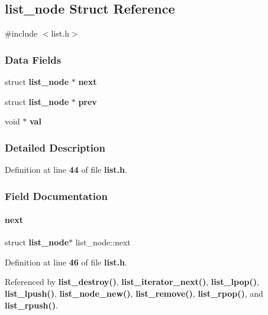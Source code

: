 \subsection{list\+\_\+node Struct Reference}
\label{a00167}


{\ttfamily \#include $<$list.\+h$>$}

\subsubsection*{Data Fields}
\begin{DoxyCompactItemize}
\item 
struct \textbf{ list\+\_\+node} $\ast$ \textbf{ next}
\item 
struct \textbf{ list\+\_\+node} $\ast$ \textbf{ prev}
\item 
void $\ast$ \textbf{ val}
\end{DoxyCompactItemize}


\subsubsection{Detailed Description}


Definition at line \textbf{ 44} of file \textbf{ list.\+h}.



\subsubsection{Field Documentation}
\mbox{\label{a00167_a0b99ca890dbfe832a8475f4bbd72338c}} 
\paragraph{next}
{\footnotesize\ttfamily struct \textbf{ list\+\_\+node}$\ast$ list\+\_\+node\+::next}



Definition at line \textbf{ 46} of file \textbf{ list.\+h}.



Referenced by \textbf{ list\+\_\+destroy()}, \textbf{ list\+\_\+iterator\+\_\+next()}, \textbf{ list\+\_\+lpop()}, \textbf{ list\+\_\+lpush()}, \textbf{ list\+\_\+node\+\_\+new()}, \textbf{ list\+\_\+remove()}, \textbf{ list\+\_\+rpop()}, and \textbf{ list\+\_\+rpush()}.

\mbox{\label{a00167_a30baba3b27442cbca9694076003ed65e}} 
